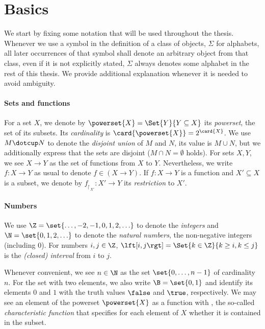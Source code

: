 \documentclass[../../diss.tex]{subfiles}
\begin{document}
\section{Basics}%
\label{Section:PrelimsBasics}%

We start by fixing some notation that will be used throughout the thesis.
Whenever we use a symbol in the definition of a class of objects, \eg $\Sigma$ for alphabets, all later occurrences of that symbol shall denote an arbitrary object from that class, even if it is not explicitly stated, \eg $\Sigma$ always denotes some alphabet in the rest of this thesis.
We provide additional explanation whenever it is needed to avoid ambiguity.

\paragraph{Sets and functions}

For a set $X$, we denote by $\powerset{X} = \Set{ Y }{Y \subseteq X}$ its \emph{powerset}, the set of its subsets.
Its \emph{cardinality} is $\card{\powerset{X}} = 2^{\card{X}}$.
We use $M \dotcup N$ to denote the \emph{disjoint union} of $M$ and $N$, \ie its value is $M \cup N$, but we additionally express that the sets are disjoint ($M \cap N = \emptyset$ holds).
For sets $X, Y$, we see $X \to Y$ as the set of functions from $X$ to $Y$.
Nevertheless, we write $f \colon X \to Y$ as usual to denote $f \in (X \to Y)$.
If $f \colon X \to Y$ is a function and $X' \subseteq X$ is a subset, we denote by $f_{\restriction_{X'}} \colon X' \to Y$ its \emph{restriction} to $X'$.

\paragraph{Numbers}

We use $\Z = \set{ \ldots, -2, -1, 0, 1, 2, \ldots}$ to denote the \emph{integers} and $\N = \set{0, 1, 2, \ldots}$ to denote the \emph{natural numbers}, the non-negative integers (including $0$).
For numbers $i,j \in \Z$, $\fromto{i}{j} = \Set{ k \in \Z  }{ k \geq i, k \leq j}$ is the \emph{(closed) interval} from $i$ to $j$.


Whenever convenient, we see $n \in \N$ as the set $\set{0, \ldots, n-1}$ of cardinality $n$.
For the set with two elements, we also write $\B = \set{0,1}$ and identify its elements $0$ and $1$ with the truth values $\false$ and $\true$, respectively.
We may see an element of the powerset $\powerset{X}$ as a function with , the so-called \emph{characteristic function} that specifies for each element of $X$ whether it is contained in the subset.
\end{document}
